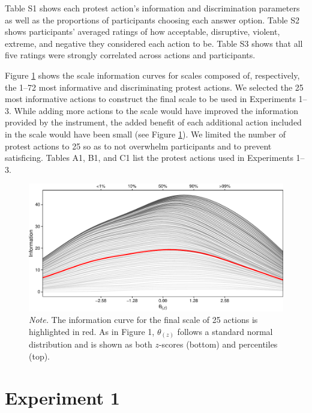 \documentclass[12pt, letterpaper]{article}
\begin{document}
Table S1 shows each protest action's information and discrimination
parameters as well as the proportions of participants choosing each
answer option. Table S2 shows participants' averaged ratings of how
acceptable, disruptive, violent, extreme, and negative they considered
each action to be. Table S3 shows that all five ratings were strongly
correlated across actions and participants.

Figure \ref{fig:s1} shows the scale information curves for scales
composed of, respectively, the 1--72 most informative and discriminating
protest actions. We selected the 25 most informative actions to
construct the final scale to be used in Experiments 1--3. While adding
more actions to the scale would have improved the information provided
by the instrument, the added benefit of each additional action included
in the scale would have been small (see Figure \ref{fig:s1}). We limited
the number of protest actions to 25 so as to not overwhelm participants
and to prevent satisficing. Tables A1, B1, and C1 list the protest
actions used in Experiments 1--3.

\begin{figure}[!t]
\centering
\caption{Scale information curves for scales composed of the 1--72 most informative and discriminating protest actions}
\includegraphics[scale=1]{../Scale Development/figures/figure-s1}
\caption*{\textit{Note.} The information curve for the final scale of 25 actions is highlighted in red. As in Figure 1, $\theta_{(z)}$ follows a standard normal distribution and is shown as both $z$-scores (bottom) and percentiles (top).}
\label{fig:s1}
\end{figure}

\hypertarget{experiment-1}{%
\section{Experiment 1}\label{experiment-1}}
\end{document}
